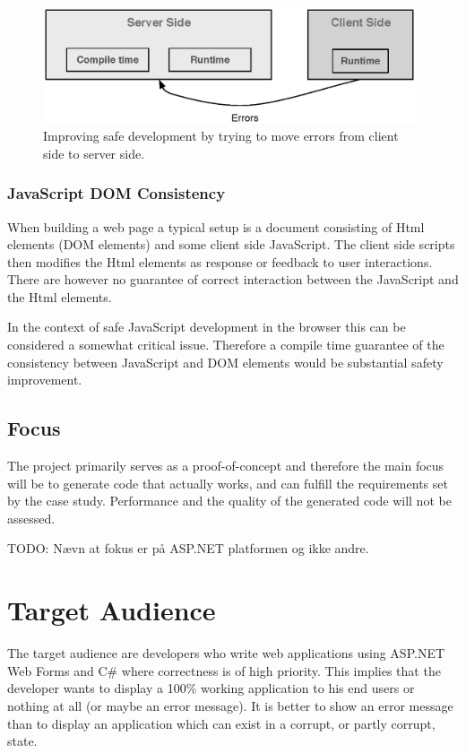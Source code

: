 			\begin{figure}
				\begin{center}
					\centerline{\includegraphics[width=11cm]{resources/images/MovingErrors.eps}}
				\end{center}
				\caption{Improving safe development by trying to move errors from client side to server side.}
				\label{movingErrors}
			\end{figure}

		\subsubsection{JavaScript DOM Consistency} %
		\label{ssub:javascript_dom_consistency}
			When building a web page a typical setup is a document consisting of Html elements (DOM elements) and some client side JavaScript. The client side scripts then modifies the Html elements as response or feedback to user interactions. There are however no guarantee of correct interaction between the JavaScript and the Html elements.

			In the context of safe JavaScript development in the browser this can be considered a somewhat critical issue. Therefore a compile time guarantee of the consistency between JavaScript and DOM elements would be substantial safety improvement.




	\subsection{Focus}
		The project primarily serves as a proof-of-concept and therefore the main focus will be to generate code that actually works, and can fulfill the requirements set by the case study. Performance and the quality of the generated code will not be assessed. 

		TODO: Nævn at fokus er på ASP.NET platformen og ikke andre.

\section{Target Audience}
	The target audience are developers who write web applications using ASP.NET Web Forms and C\# where correctness is of high priority. This implies that the developer wants to display a 100\% working application to his end users or nothing at all (or maybe an error message). It is better to show an error message than to display an application which can exist in a corrupt, or partly corrupt, state.






